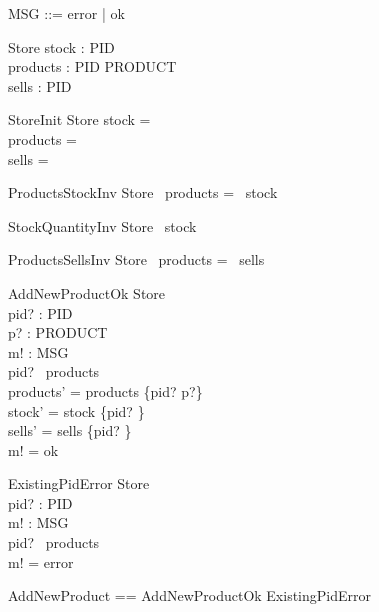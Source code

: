 \begin{zed}
\also
MSG ::= error | ok
\end{zed}

\begin{schema}{Store}
stock : PID \pfun \nat \\
products : PID \pfun PRODUCT \\
sells : PID \pfun \seq \nat
\end{schema}

\begin{schema}{StoreInit}
Store
\where
stock = \emptyset \\
products = \emptyset \\
sells = \emptyset
\end{schema}

\begin{schema}{ProductsStockInv}
Store
\where
\dom~products = \dom~stock
\end{schema}

\begin{schema}{StockQuantityInv}
Store
\where
\ran~stock \subseteq \nat
\end{schema}

\begin{schema}{ProductsSellsInv}
Store
\where
\dom~products = \dom~sells
\end{schema}

\begin{schema}{AddNewProductOk}
\Delta Store \\
pid? : PID \\
p? : PRODUCT \\
m! : MSG \\
\where
pid? \notin \dom~products \\
products' = products \cup \{pid? \mapsto p?\} \\
stock' = stock \cup \{pid? \} \\
sells' = sells \cup \{pid? \mapsto \langle \rangle\} \\
m! = ok 
\end{schema}

\begin{schema}{ExistingPidError}
\Xi Store \\
pid? : PID \\
m! : MSG \\
\where
pid? \in \dom~products \\
m! = error
\end{schema}

\begin{zed}
AddNewProduct == AddNewProductOk \lor ExistingPidError
\end{zed}

